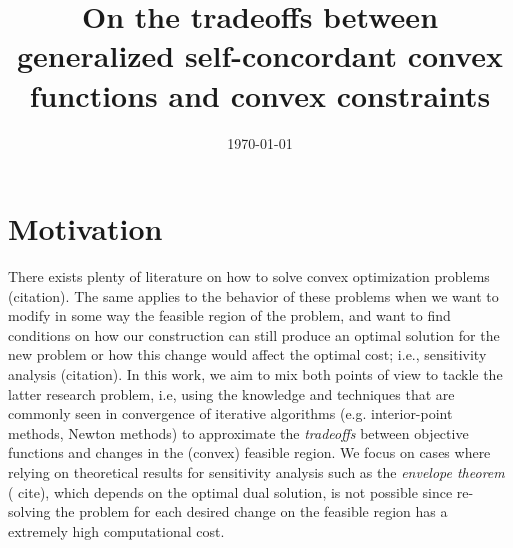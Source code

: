 \documentclass[11pt]{article}
\title{On the tradeoffs between generalized self-concordant convex functions and convex constraints}
\date{\today}
\theoremstyle{definition}
\theoremstyle{remark}
\theoremstyle{plain}
\theoremstyle{definition}
\newcommand{\1}{\mathbf{1}}
\begin{document}
\maketitle



\section*{Motivation}

There exists plenty of literature on how to solve convex optimization problems {\color{red} (citation)}. The same applies to the behavior of these problems when we want to modify in some way the feasible region of the problem, and want to find conditions on how our construction can still produce an optimal solution for the new problem or how this change would affect the optimal cost; i.e., sensitivity analysis {\color{red} (citation)}. In this work, we aim to mix both points of view to tackle the latter research problem, i.e, using the knowledge and techniques that are commonly seen in convergence of iterative algorithms (e.g. interior-point methods, Newton methods) to approximate the \textit{tradeoffs} between objective functions and changes in the (convex) feasible region. We focus on cases where relying on theoretical results for sensitivity analysis such as the \textit{envelope theorem} {(\color{red} cite)}, which depends on the optimal dual solution, is not possible since re-solving the problem for each desired change on the feasible region has a extremely high computational cost.  
\end{document}
